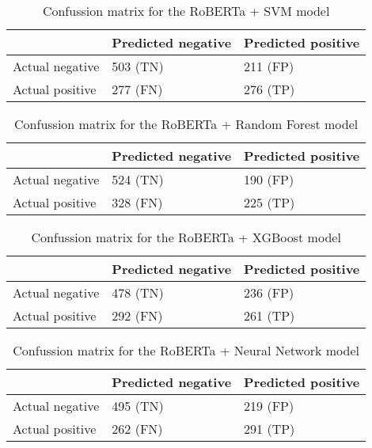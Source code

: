 \begin{table}[!htbp]
\centering
{
\makegapedcells
\begin{tabular}{lll}
                & Predicted negative & Predicted positive \\
\hline
Actual negative & 503 (TN)           & 211 (FP) \\
Actual positive & 277 (FN)           & 276 (TP) \\
\hline
\end{tabular}
}
\caption{Confussion matrix for the RoBERTa + SVM model}
\label{robertasvm_cm}
\end{table}

\begin{table}[!htbp]
\centering
{
\makegapedcells
\begin{tabular}{lll}
                & Predicted negative & Predicted positive \\
\hline
Actual negative & 524 (TN)           & 190 (FP) \\
Actual positive & 328 (FN)           & 225 (TP) \\
\hline
\end{tabular}
}
\caption{Confussion matrix for the RoBERTa + Random Forest model}
\label{robertarf_cm}
\end{table}

\begin{table}[!htbp]
\centering
{
\makegapedcells
\begin{tabular}{lll}
                & Predicted negative & Predicted positive \\
\hline
Actual negative & 478 (TN)           & 236 (FP) \\
Actual positive & 292 (FN)           & 261 (TP) \\
\hline
\end{tabular}
}
\caption{Confussion matrix for the RoBERTa + XGBoost model}
\label{robertaxgb_cm}
\end{table}

\begin{table}[!htbp]
\centering
{
\makegapedcells
\begin{tabular}{lll}
                & Predicted negative & Predicted positive \\
\hline
Actual negative & 495 (TN)           & 219 (FP) \\
Actual positive & 262 (FN)           & 291 (TP) \\
\hline
\end{tabular}
}
\caption{Confussion matrix for the RoBERTa + Neural Network model}
\label{robertann_cm}
\end{table}


